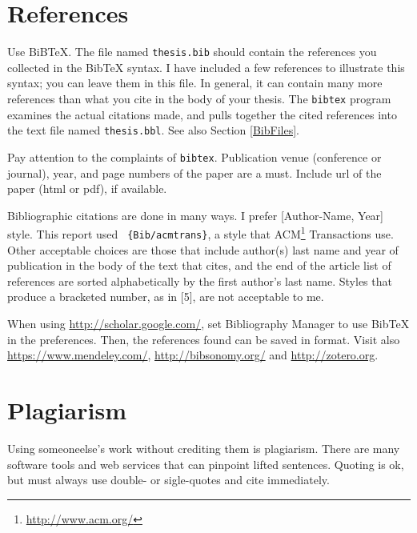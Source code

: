 \section{References}
\label{References}

Use BiBTeX.  The file named {\tt thesis.bib} should contain the
references you collected in the {BibTeX} syntax.  I have included a
few references to illustrate this syntax; you can leave them in this
file.  In general, it can contain many more references than what you
cite in the body of your thesis.  The {\tt bibtex} program examines
the actual citations made, and pulls together the cited references
into the text file named {\tt thesis.bbl}.  See also Section
\ref{BibFiles}.

Pay attention to the complaints of {\tt bibtex}.  Publication venue
(conference or journal), year, and page numbers of the paper are a
must.  Include {\sc url} of the paper ({\sc html} or {\sc pdf}), if
available.

Bibliographic citations are done in many ways.  I prefer [Author-Name,
  Year] style.  This report used {\tt
  \verb||\{Bib/acmtrans\}}, a style that
ACM\footnote{\url{http://www.acm.org/}} Transactions use.  Other
acceptable choices are those that include author(s) last name and year
of publication in the body of the text that cites, and the end of the
article list of references are sorted alphabetically by the first
author's last name.  Styles that produce a bracketed number, as in
[5], are not acceptable to me.

When using \url{http://scholar.google.com/}, set Bibliography Manager
to use BibTeX in the preferences.  Then, the references found
can be saved in \bibtex{} format.  Visit also
\url{https://www.mendeley.com/},
\url{http://bibsonomy.org/} and \url{http://zotero.org}.

\section{Plagiarism}

Using someoneelse's work without crediting them is plagiarism.  There
are many software tools and web services that can pinpoint lifted
sentences.  Quoting is ok, but must always use double- or sigle-quotes
and cite immediately.

